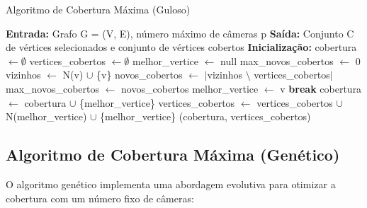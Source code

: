 \documentclass[12pt, a4paper]{report}
\begin{document}
\begin{algorithm}[H]
\caption{Algoritmo de Cobertura Máxima (Guloso)}
\begin{algorithmic}[1]
\State \textbf{Entrada:} Grafo G = (V, E), número máximo de câmeras p
\State \textbf{Saída:} Conjunto C de vértices selecionados e conjunto de vértices cobertos
\Statex
\State \textbf{Inicialização:}
\State cobertura $\gets \emptyset$
\State vertices\_cobertos $\gets \emptyset$
\Statex
{}
    \State melhor\_vertice $\gets$ null
    \State max\_novos\_cobertos $\gets$ 0
            \State vizinhos $\gets$ N(v) $\cup$ \{v\}
            \State novos\_cobertos $\gets$ $\lvert$vizinhos $\setminus$ vertices\_cobertos$\rvert$
                \State max\_novos\_cobertos $\gets$ novos\_cobertos
                \State melhor\_vertice $\gets$ v
            \EndIf
        \EndIf
    \EndFor
        \State \textbf{break}
    \EndIf
    \State cobertura $\gets$ cobertura $\cup$ \{melhor\_vertice\}
    \State vertices\_cobertos $\gets$ vertices\_cobertos $\cup$ N(melhor\_vertice) $\cup$ \{melhor\_vertice\}
\EndFor
\State \Return (cobertura, vertices\_cobertos)
\end{algorithmic}
\end{algorithm}

\subsection{Algoritmo de Cobertura Máxima (Genético)}
O algoritmo genético implementa uma abordagem evolutiva para otimizar a cobertura com um número fixo de câmeras:
\end{document}
